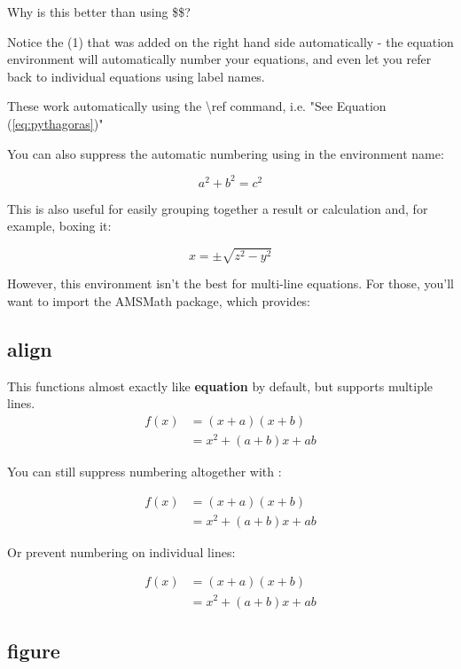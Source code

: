 \documentclass{article}
\begin{document}
Why is this better than using \$\$?

Notice the (1) that was added on the right hand side automatically - the equation environment will automatically number your equations, and even let you refer back to individual equations using label names. 

These work automatically using the \textbackslash ref command, i.e. "See Equation (\ref{eq:pythagoras})"

\newpage

You can also suppress the automatic numbering using \* in the environment name:

\begin{equation*}
    a^2 + b^2 = c^2
    \label{eq:pythagoras2}
\end{equation*}

This is also useful for easily grouping together a result or calculation and, for example, boxing it:

\begin{equation}
 \boxed{x = \pm \sqrt{z^2 - y^2}}
\end{equation}

However, this environment isn't the best for multi-line equations. For those, you'll want to import the AMSMath package, which provides:

\subsection{align}
This functions almost exactly like \textbf{equation} by default, but supports multiple lines.
\begin{align}
 f(x) &= (x+a)(x+b) \\
      &= x^2 + (a+b)x + ab
\end{align}

You can still suppress numbering altogether with \*:

\begin{align*}
 f(x) &= (x+a)(x+b) \\
      &= x^2 + (a+b)x + ab
\end{align*}

Or prevent numbering on individual lines:

\begin{align}
 f(x) &= (x+a)(x+b) \nonumber \\
      &= x^2 + (a+b)x + ab
\end{align}

\subsection{figure}
\end{document}
